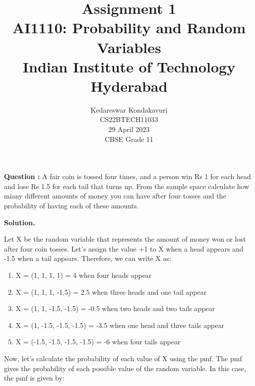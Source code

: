 \documentclass[journal,12pt,twocolumn]{IEEEtran}
\begin{document}
\let\vec\mathbf

\title{Assignment 1 \\ \Large AI1110: Probability and Random Variables \\ \large Indian Institute of Technology Hyderabad}
\author{Kedareswar Kondakavuri \\ \normalsize CS22BTECH11033 \\ \vspace*{20pt} \normalsize  29 April 2023 \\ \vspace*{20pt} \Large CBSE Grade 11}

	\maketitle
	
	\textbf{Question :}
	A fair coin is tossed four times, and a person win  Rs 1 for each head and lose
	Rs 1.5 for each tail that turns up.
	From the sample space calculate how miany different amounts of money you can
        have after four tosses and the probability of having each of these amounts.
       
	\textbf{Solution.}

        Let X be the random variable that represents the amount of money won or lost after four coin tosses. Let's assign the value +1 to X when a head appears and -1.5 when a tail appears. Therefore, we can write X as:
	
        \begin{enumerate}[label=(\roman*)]
		
			\item X = (1, 1, 1, 1) = 4 when four heads appear
			\item X = (1, 1, 1, -1.5) = 2.5 when three heads and one tail appear
			\item X = (1, 1, -1.5, -1.5) = -0.5 when two heads and two tails appear
			\item X = (1, -1.5, -1.5, -1.5) = -3.5 when one head and three tails appear
			\item X = (-1.5, -1.5, -1.5, -1.5) = -6 when four tails appear


	\end{enumerate}

	Now, let's calculate the probability of each value of X using the pmf. The pmf gives the probability of each possible value of the random variable. In this case, the pmf is given by:
\end{document}
